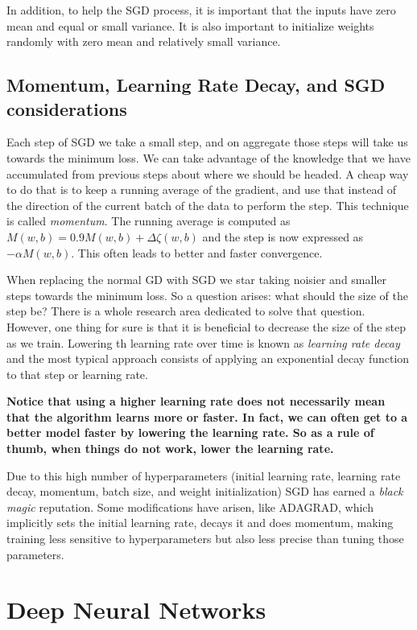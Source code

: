 \documentclass[english, 11pt]{article}
\begin{document}
	In addition, to help the \ac{SGD} process, it is important that the inputs have zero mean and equal or small variance. It is also important to initialize weights randomly with zero mean and relatively small variance.

	\subsection{Momentum, Learning Rate Decay, and SGD considerations}

	Each step of \ac{SGD} we take a small step, and on aggregate those steps will take us towards the minimum loss. We can take advantage of the knowledge that we have accumulated from previous steps about where we should be headed. A cheap way to do that is to keep a running average of the gradient, and use that instead of the direction of the current batch of the data to perform the step. This technique is called \emph{momentum}. The running average is computed as $M(w,b) = 0.9M(w,b) + \Delta\zeta(w,b)$ and the step is now expressed as $-\alpha M(w,b)$. This often leads to better and faster convergence.

	When replacing the normal \ac{GD} with \ac{SGD} we star taking noisier and smaller steps towards the minimum loss. So a question arises: what should the size of the step be? There is a whole research area dedicated to solve that question. However, one thing for sure is that it is beneficial to decrease the size of the step as we train. Lowering th learning rate over time is known as \emph{learning rate decay} and the most typical approach consists of applying an exponential decay function to that step or learning rate.

	\textbf{Notice that using a higher learning rate does not necessarily mean that the algorithm learns more or faster. In fact, we can often get to a better model faster by lowering the learning rate. So as a rule of thumb, when things do not work, lower the learning rate.}

	Due to this high number of hyperparameters (initial learning rate, learning rate decay, momentum, batch size, and weight initialization) \ac{SGD} has earned a \textit{black magic} reputation. Some modifications have arisen, like ADAGRAD, which implicitly sets the initial learning rate, decays it and does momentum, making training less sensitive to hyperparameters but also less precise than tuning those parameters.

	\section{Deep Neural Networks}
\end{document}
